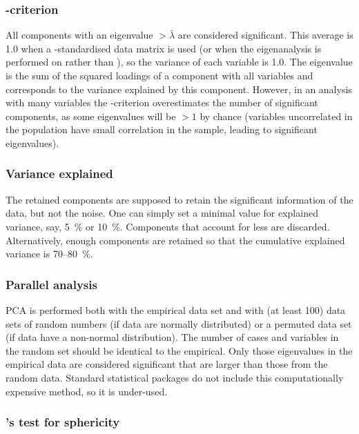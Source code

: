 \subsubsection{-criterion}

All components with an eigenvalue \(> \bar{\lambda} \) are considered significant. This average is \num{1.0} when a -standardised data matrix is used (or when the eigenanalysis is performed on  rather than ), so the variance of each variable is \num{1.0}. The eigenvalue is the sum of the squared loadings of a component with all variables and corresponds to the variance explained by this component. However, in an analysis with many variables the -criterion overestimates the number of significant components, as some eigenvalues will be \(> 1 \) by chance (variables uncorrelated in the population have small correlation in the sample, leading to significant eigenvalues).

\subsubsection{Variance explained}

The retained components are supposed to retain the significant information of the data, but not the noise. One can simply set a minimal value for explained variance, say, \SI{5}{\%} or \SI{10}{\%}. Components that account for less are discarded. Alternatively, enough components are retained so that the cumulative explained variance is \num{70}--\SI{80}{\%}.

\subsubsection{Parallel analysis}

\acs{PCA} is performed both with the empirical data set and with (at least 100) data sets of random numbers (if data are normally distributed) or a permuted data set (if data have a non-normal distribution). The number of cases and variables in the random set should be identical  to the empirical. Only those eigenvalues in the empirical data are considered significant that are larger than those from the random data. Standard statistical packages do not include this computationally expensive method, so it is under-used.

\subsubsection{'s test for sphericity}

